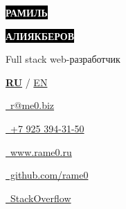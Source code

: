 \documentclass[10pt]{tpl/developercv} %
\begin{document}

\begin{minipage}[t]{0.44\textwidth} %
	\vspace{-\baselineskip} %

	\colorbox{black}{{\Huge\textcolor{white}{\textbf{\MakeUppercase{Рамиль}}}}} %

	\colorbox{black}{{\Huge\textcolor{white}{\textbf{\MakeUppercase{Алиякберов}}}}} %

	\vspace{6pt}

	{\Large Full stack web-разработчик} %

  \vspace{6pt}

  \textbf{\underline{RU}} / \href{https://rame0.github.io/resume-latex/resume_en.pdf}{EN}

\end{minipage}
\begin{minipage}[t]{0.275\textwidth} %
	\vspace{-\baselineskip} %


	\href{mailto:r@me0.biz}{\ r@me0.biz}

	\href{tel:+79253943150}{\ +7 925 394-31-50}
\end{minipage}
\begin{minipage}[t]{0.275\textwidth} %
	\vspace{-\baselineskip} %

	\href{https://www.rame0.ru/}{\ www.rame0.ru}

	\href{https://github.com/rame0}{\ github.com/rame0}

	\href{https://stackoverflow.com/users/513723/rame0}{\ StackOverflow}

\end{minipage}
\end{document}
